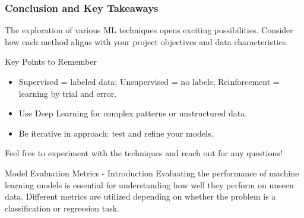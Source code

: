 \documentclass[aspectratio=169]{beamer}
\begin{document}
\begin{frame}[fragile]
    \frametitle{Conclusion and Key Takeaways}
    The exploration of various ML techniques opens exciting possibilities. Consider how each method aligns with your project objectives and data characteristics.
    
    \begin{block}{Key Points to Remember}
        \begin{itemize}
            \item Supervised = labeled data; Unsupervised = no labels; Reinforcement = learning by trial and error.
            \item Use Deep Learning for complex patterns or unstructured data.
            \item Be iterative in approach: test and refine your models.
        \end{itemize}
    \end{block}
    
    Feel free to experiment with the techniques and reach out for any questions!
\end{frame}

\begin{frame}[fragile]{Model Evaluation Metrics - Introduction}
    Evaluating the performance of machine learning models is essential for understanding how well they perform on unseen data. Different metrics are utilized depending on whether the problem is a classification or regression task.
\end{frame}
\end{document}
